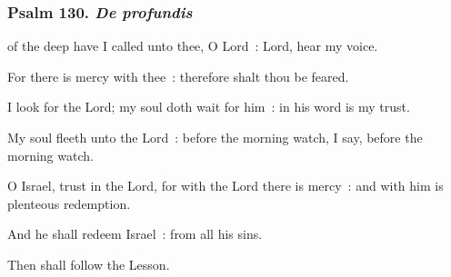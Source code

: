 \subsubsection{Psalm 130. \textit{De profundis}}
 of the deep have I called unto thee, O Lord~: Lord, hear my voice.\par
{}
For there is mercy with thee~: therefore shalt thou be feared.\par
{}I look for the Lord; my soul doth wait for him~: in his word is my trust.\par
{}My soul fleeth unto the Lord~: before the morning watch, I say, before the morning watch.\par
{}O Israel, trust in the Lord, for with the Lord there is mercy~: and with him is plenteous redemption.\par
{}And he shall redeem Israel~: from all his sins.\par

\begin{rubric}
	Then shall follow the Lesson.
\end{rubric}

